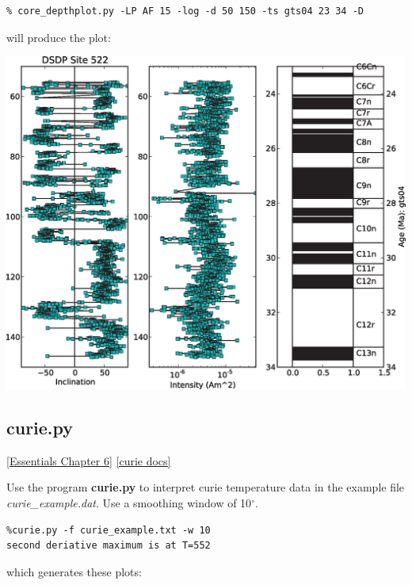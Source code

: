 \documentclass[11pt]{book}
\begin{document}
{{{\begin{verbatim}
% core_depthplot.py -LP AF 15 -log -d 50 150 -ts gts04 23 34 -D
\end{verbatim}

\noindent  will produce the plot:

\includegraphics[width=15cm]{EPSfiles/core-depthplot.eps}


\subsection{curie.py} 
\href{http://magician.ucsd.edu/Essentials_2/WebBook2ch6.html#ch6}{[Essentials Chapter 6]}
\href{http://earthref.org/PmagPy/pmagpydocs/curie-module.html}{[curie docs]}

Use the program {\bf curie.py} to interpret curie temperature data in the example file {\it curie\_example.dat}.  Use a smoothing window of 10$^{\circ}$.



\begin{verbatim}
%curie.py -f curie_example.txt -w 10
second deriative maximum is at T=552
\end{verbatim}

\noindent which generates these plots:

}}}
\end{document}
